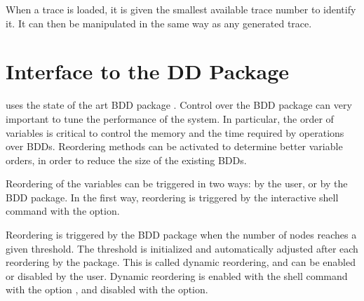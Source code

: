 When a trace is loaded, it is given the smallest available trace
number to identify it. It can then be manipulated in the same way as
any generated trace.


\section{Interface to the DD Package}
\label{Interface to DD package}
\label{DD package interface}

\nusmv uses the state of the art BDD package \cudd \cite{Som98}.
Control over the BDD package can very important to tune the
performance of the system. In particular, the order of variables is
critical to control the memory and the time required by operations
over BDDs.  Reordering methods can be activated to determine better
variable orders, in order to reduce the size of the existing BDDs.

Reordering of the variables can be triggered in two ways: by the user,
or by the BDD package.  In the first way, reordering is triggered by
the interactive shell command  with the
 option.

Reordering is triggered by the BDD package when the number of nodes
reaches a given threshold. The threshold is initialized and
automatically adjusted after each reordering by the package.  This is
called dynamic reordering, and can be enabled or disabled by the
user.  Dynamic reordering is enabled with the shell command
 with the option , and disabled
with the  option. 


